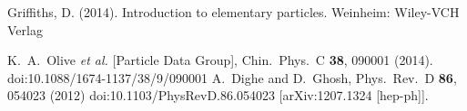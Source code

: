 \documentclass[12pt]{article}
\begin{document}
\begin{enumerate}
\begin{thebibliography}{9}
Griffiths, D. (2014). Introduction to elementary particles. Weinheim: Wiley-VCH Verlag

  K.~A.~Olive {\it et al.} [Particle Data Group],
  Chin.\ Phys.\ C {\bf 38}, 090001 (2014).
  doi:10.1088/1674-1137/38/9/090001
  A.~Dighe and D.~Ghosh,
  Phys.\ Rev.\ D {\bf 86}, 054023 (2012)
  doi:10.1103/PhysRevD.86.054023
  [arXiv:1207.1324 [hep-ph]].
\end{thebibliography}
\end{enumerate}
\end{document}
